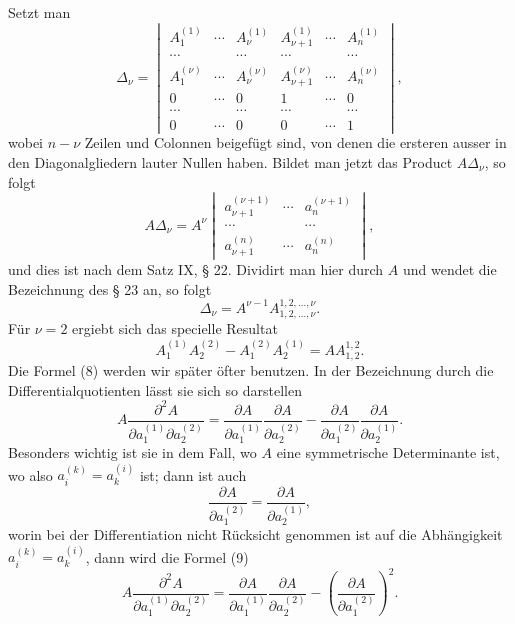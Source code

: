 \documentclass[11pt]{article}
\begin{document}
Setzt man
\[
\Delta_\nu=\begin{vmatrix}
 A_1^{(1)}&\cdots&A_\nu^{(1)}&A_{\nu+1}^{(1)}&\cdots&A_n^{(1)}\\
 \cdots&&\cdots&\cdots&&\cdots\\
 A_1^{(\nu)}&\cdots&A_\nu^{(\nu)}&A_{\nu+1}^{(\nu)}&\cdots&A_n^{(\nu)}\\
 0&\cdots&0&1&\cdots&0\\
 \cdots&&\cdots&\cdots&&\cdots\\
 0&\cdots&0&0&\cdots&1
\end{vmatrix},\tag{5}
\]
wobei $n-\nu$ Zeilen und Colonnen beigefügt sind, von denen die ersteren ausser in den Diagonalgliedern lauter Nullen haben. Bildet man jetzt das Product $A\Delta_\nu$, so folgt
\[
 A\Delta_\nu=A^\nu
 \begin{vmatrix}
 a_{\nu+1}^{(\nu+1)}&\cdots&a_n^{(\nu+1)}\\
 \cdots&&\cdots\\
 a_{\nu+1}^{(n)}&\cdots&a_n^{(n)}
 \end{vmatrix},\tag{6}
\]
und dies ist nach dem Satz IX, § 22. Dividirt man hier durch $A$ und wendet die Bezeichnung des § 23 an, so folgt
\begin{equation}
 \Delta_\nu=A^{\nu-1}A_{1,2,\ldots,\nu}^{1,2,\ldots,\nu}.\tag{7}
\end{equation}
Für $\nu=2$ ergiebt sich das specielle Resultat
\begin{equation}
 A_1^{(1)}A_2^{(2)}-A_1^{(2)}A_2^{(1)}=A A_{1,2}^{1,2}.\tag{8}
\end{equation}
Die Formel (8) werden wir später öfter benutzen. In der Bezeichnung durch die Differentialquotienten lässt sie sich so darstellen
\begin{equation}
 A\frac{\partial^2A}{\partial a_1^{(1)}\partial a_2^{(2)}}
 =\frac{\partial A}{\partial a_1^{(1)}}\frac{\partial A}{\partial a_2^{(2)}}
 -\frac{\partial A}{\partial a_1^{(2)}}\frac{\partial A}{\partial a_2^{(1)}}.\tag{9}
\end{equation}
Besonders wichtig ist sie in dem Fall, wo $A$ eine symmetrische Determinante ist, wo also $a_i^{(k)}=a_k^{(i)}$ ist; dann ist auch
\[
 \frac{\partial A}{\partial a_1^{(2)}}=\frac{\partial A}{\partial a_2^{(1)}},
\]
worin bei der Differentiation nicht Rücksicht genommen ist auf die Abhängigkeit $a_i^{(k)}=a_k^{(i)}$, dann wird die Formel (9)
\begin{equation}
 A\frac{\partial^2A}{\partial a_1^{(1)}\partial a_2^{(2)}}
 =\frac{\partial A}{\partial a_1^{(1)}}\frac{\partial A}{\partial a_2^{(2)}}
 -\left(\frac{\partial A}{\partial a_1^{(2)}}\right)^2.\tag{10}
\end{equation}
\end{document}
